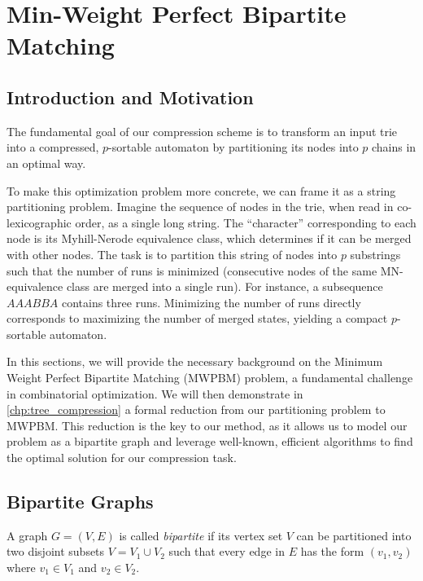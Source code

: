 \section{Min-Weight Perfect Bipartite Matching} \label{chp:min_weight_perfect_bipartite_matching}

\subsection{Introduction and Motivation}
The fundamental goal of our compression scheme is to transform an input trie into a compressed, $p$-sortable automaton by partitioning its nodes into $p$ chains in an optimal way.

To make this optimization problem more concrete, we can frame it as a string partitioning problem. Imagine the sequence of nodes in the trie, when read in co-lexicographic order, as a single long string. The ``character'' corresponding to each node is its Myhill-Nerode equivalence class, which determines if it can be merged with other nodes. The task is to partition this string of nodes into $p$ substrings such that the number of runs is minimized (consecutive nodes of the same MN-equivalence class are merged into a single run). For instance, a subsequence $AAABBA$ contains three runs. Minimizing the number of runs directly corresponds to maximizing the number of merged states, yielding a compact $p$-sortable automaton.

In this sections, we will provide the necessary background on the Minimum Weight Perfect Bipartite Matching (MWPBM) problem, a fundamental challenge in combinatorial optimization. We will then demonstrate in \cref{chp:tree_compression} a formal reduction from our partitioning problem to MWPBM. This reduction is the key to our method, as it allows us to model our problem as a bipartite graph and leverage well-known, efficient algorithms to find the optimal solution for our compression task.

\subsection{Bipartite Graphs} 
\begin{definition} \label{def:bipartite}
    A graph $G=(V,E)$ is called \textit{bipartite} if its vertex set $V$ can be partitioned into two disjoint subsets $V=V_1 \cup V_2$ such that every edge in $E$ has the form $(v_1,v_2)$ where $v_1\in V_1$ and $v_2 \in V_2$.
\end{definition} 

